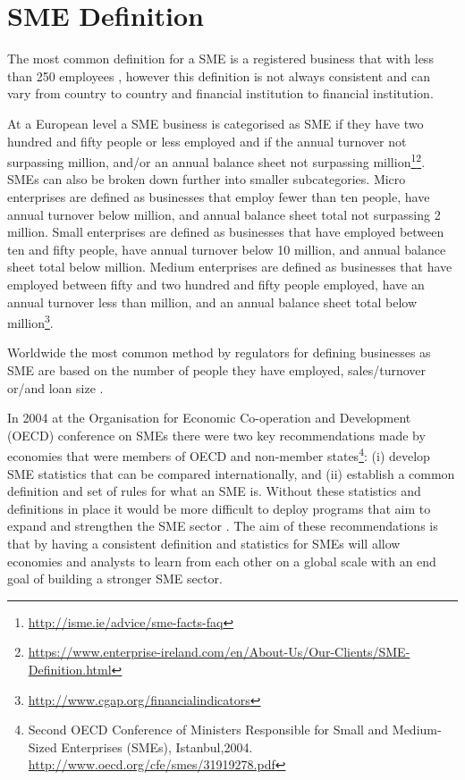 \section{SME Definition}
The most common definition for a SME is a registered business that with less than 250 employees \citep{ifc_sme_2009}, however this definition is not always consistent and can vary from country to country and financial institution to financial institution. 

At a European level a SME business is categorised as SME if they have two hundred and fifty people or less employed and if the annual turnover not surpassing  million, and/or an annual balance sheet not surpassing  million\footnote{\url{http://isme.ie/advice/sme-facts-faq}}\footnote{\url{https://www.enterprise-ireland.com/en/About-Us/Our-Clients/SME-Definition.html}}. SMEs can also be broken down further into smaller subcategories. Micro enterprises are defined as businesses that employ fewer than ten people, have annual turnover below  million, and annual balance sheet total not surpassing 2 million. Small enterprises are defined as businesses that have employed between ten and fifty people, have annual turnover below 10 million, and annual balance sheet total below  million. Medium enterprises are defined as businesses that have employed between fifty and two hundred and fifty people employed, have an annual turnover less than  million, and an annual balance sheet total below  million\footnote{\url{http://www.cgap.org/financialindicators}}.

Worldwide the most common method by regulators for defining businesses as SME are based on the number of people they have employed, sales/turnover or/and loan size \citep{ardic_small_2011}.

In 2004 at the Organisation for Economic Co-operation and Development (OECD) conference on SMEs there were two key recommendations made by economies that were members of OECD and non-member states\footnote{Second OECD Conference of Ministers Responsible for Small and Medium-Sized Enterprises (SMEs), Istanbul,2004. \url{http://www.oecd.org/cfe/smes/31919278.pdf}}: (i) develop SME statistics that can be compared internationally, and (ii) establish a common definition and set of rules for what an SME is. Without these statistics and definitions in place it would be more difficult to deploy programs that aim to expand and strengthen the SME sector \citep{ardic_small_2011}. The aim of these recommendations is that by having a consistent definition and statistics for SMEs will allow economies and analysts to learn from each other on a global scale with an end goal of building a stronger SME sector.


